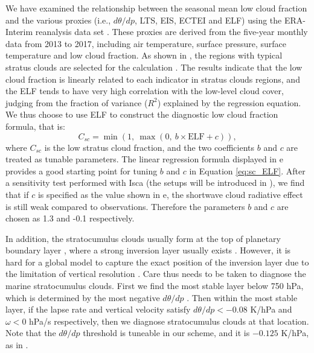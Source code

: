 We have examined the relationship between the seasonal mean low cloud fraction and the various proxies (i.e., $d\theta/dp$, LTS, EIS, ECTEI and ELF) using the ERA-Interim reanalysis data set \citep{Dee2011}. These proxies are derived from the five-year monthly data from 2013 to 2017, including air temperature, surface pressure, surface temperature and low cloud fraction. As shown in , the regions with typical stratus clouds are selected for the calculation \citep{Klein1993}. The results indicate that the low cloud fraction is linearly related to each indicator in stratus clouds regions, and the ELF tends to have very high correlation with the low-level cloud cover, judging from the fraction of variance ($R^2$) explained by the regression equation. We thus choose to use ELF to construct the diagnostic low cloud fraction formula, that is:
\begin{equation}
	C_{sc} = \min(1, ~\max(0, ~b\times \text{ELF} + c)),
	\label{eq:sc_ELF}
\end{equation}
where $C_{sc}$ is the low stratus cloud fraction, and the two coefficients $b$ and $c$ are treated as tunable parameters. The linear regression formula displayed in e provides a good starting point for tuning $b$ and $c$ in Equation \eqref{eq:sc_ELF}. After a sensitivity test performed with Isca (the setups will be introduced in ), we find that if $c$ is specified as the value shown in e, the shortwave cloud radiative effect is still weak compared to observations. Therefore the parameters $b$ and $c$ are chosen as 1.3 and -0.1 respectively.

In addition, the stratocumulus clouds usually form at the top of planetary boundary layer \citep{Wood2012}, where a strong inversion layer usually exists \citep{Wood2006,Park2019}. However, it is hard for a global model to capture the exact position of the inversion layer due to the limitation of vertical resolution  \citep{Kawai2019}. Care thus needs to be taken to diagnose the marine stratocumulus clouds. First we find the most stable layer below 750 hPa, which is determined by the most negative $d\theta/dp$ \citep{Slingo1987}. Then within the most stable layer, if the lapse rate and vertical velocity satisfy $d\theta/dp<-0.08$ K/hPa and $\omega<0$ hPa/s respectively, then we diagnose stratocumulus clouds at that location. Note that the $d\theta/dp$ threshold is tuneable in our scheme, and it is $-0.125$ K/hPa, as in \citet{Collins2004}.


